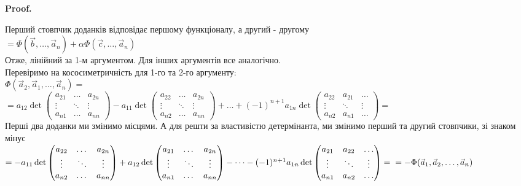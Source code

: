 \documentclass[a4paper, 10pt]{article}
\makeatletter
\theoremstyle{theoremdd}
\renewenvironment{proof}[1][Proof.\\]{\par
\pushQED{\hfill \qed}%
\normalfont \topsep6\p@\@plus6\p@\relax
\trivlist
\item\relax
{\bfseries
#1\@addpunct{.}}\hspace\labelsep\ignorespaces
}{%
\popQED\endtrivlist\@endpefalse
}
\makeatother
\begin{document}
\begin{proof}
Перший стовпчик доданків відповідає першому функціоналу, а другий - другому\\
$= \Phi(\vec{b}, \dots, \vec{a}_n) + \alpha \Phi(\vec{c},\dots, \vec{a}_n)$\\
Отже, лінійний за 1-м аргументом. Для інших аргументів все аналогічно.
\bigskip \\
Перевіримо на кососиметричність для 1-го та 2-го аргументу:\\
$\Phi(\vec{a}_2,\vec{a}_1,\dots,\vec{a}_n) = $\\
$= a_{12} \det \begin{pmatrix} a_{21} & \dots & a_{2n} \\ \vdots & \ddots & \vdots \\ a_{n1} & \dots & a_{nn} \end{pmatrix} - a_{11} \det \begin{pmatrix} a_{22} & \dots & a_{2n} \\ \vdots & \ddots & \vdots \\ a_{n2} & \dots & a_{nn} \end{pmatrix} + \dots + (-1)^{n+1} a_{1n} \det \begin{pmatrix} a_{22} & a_{21} & \dots \\ \vdots & \ddots & \vdots \\ a_{n2} & a_{n1} & \dots \end{pmatrix} = $\\
Перші два доданки ми змінимо місцями. А для решти за властивістю детермінанта, ми змінимо перший та другий стовпчики, зі знаком мінус\\
$= - a_{11} \det \begin{pmatrix} a_{22} & \dots & a_{2n} \\ \vdots & \ddots & \vdots \\ a_{n2} & \dots & a_{nn} \end{pmatrix} + a_{12} \det \begin{pmatrix} a_{21} & \dots & a_{2n} \\ \vdots & \ddots & \vdots \\ a_{n1} & \dots & a_{nn} \end{pmatrix} - \dots - (-1)^{n+1} a_{1n} \det \begin{pmatrix} a_{21} & a_{22} & \dots \\ \vdots & \ddots & \vdots \\ a_{n1} & a_{n2} & \dots \end{pmatrix} = \\ = -\Phi(\vec{a}_1,\vec{a}_2,\dots,\vec{a}_n)$\\

\end{proof}
\end{document}

